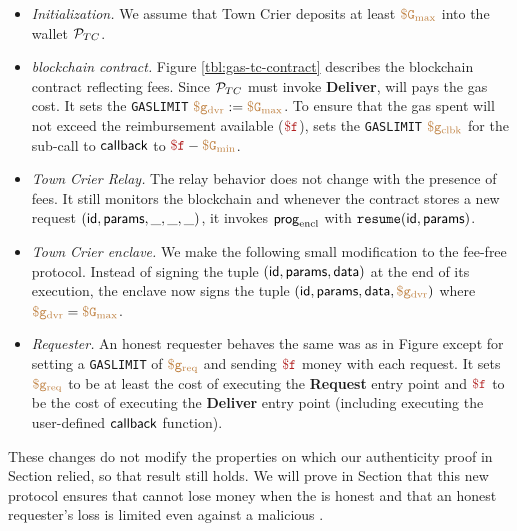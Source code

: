\begin{itemize}[leftmargin=1.5em]
  \item {\it Initialization.}
    We assume that Town Crier deposits at least $\tt {\color{brown} \$G_\text{max} }$ into the wallet ${\cal P}_{TC}$.

  \item {\it \tcs blockchain contract.}
    Figure \ref{tbl:gas-tc-contract} describes the \tcs blockchain contract reflecting fees.
    Since ${\cal P}_{TC}$ must invoke {\bf Deliver}, \tc will pays the gas cost.
    It sets the {\tt GASLIMIT} $\tt {\color{brown} \$g_\text{dvr} } := \tt {\color{brown} \$G_\text{max} }$.
    To ensure that the gas spent will not exceed the reimbursement available ($\fee$),
    \tcont sets the {\tt GASLIMIT} $\tt {\color{brown} \$g_\text{clbk} }$ for the sub-call to ${\sf callback}$ to $\fee - \constgasmin$.

  \item {\it Town Crier Relay.}
    The relay behavior does not change with the presence of fees.
    It still monitors the blockchain and whenever the contract \tcont stores a new request $({\sf id}, {\sf params}, \_, \_, \_)$,
    it invokes ${\sf prog}_{\textrm{encl}}$ with $\texttt{resume}({\sf id}, {\sf params})$.

  \item {\it Town Crier enclave.}
    We make the following small modification to the fee-free protocol.
    Instead of signing the tuple $({\sf id}, {\sf params}, {\sf data})$ at the end of its execution,
    the enclave now signs the tuple $({\sf id}, {\sf params}, {\sf data}, \tt {\color{brown} \$g_\text{dvr} })$ where $\tt {\color{brown} \$g_\text{dvr} } = \tt {\color{brown} \$G_\text{max} }$.

  \item {\it Requester.}
    An honest requester behaves the same was as in Figure  except for setting a {\tt GASLIMIT} of $\tt {\color{brown} \$g_\text{req} }$ and sending $\fee$ money with each request.
    It sets $\tt {\color{brown} \$g_\text{req} }$ to be at least the cost of executing the {\bf Request} entry point
    and $\fee$ to be the cost of executing the {\bf Deliver} entry point (including executing the user-defined ${\sf callback}$ function).
\end{itemize}

These changes do not modify the properties on which our authenticity proof in Section  relied, so that result still holds.
We will prove in Section  that this new protocol ensures that \tc cannot lose money when the \medname is honest
and that an honest requester's loss is limited even against a malicious \tc.


